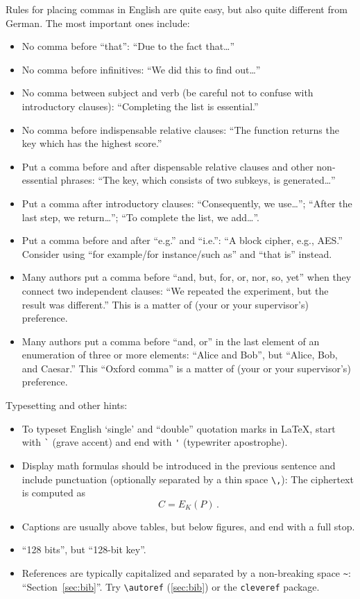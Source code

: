 \documentclass[11pt,titlepage=false]{scrreprt}
\begin{document}
Rules for placing commas in English are quite easy, but also quite different from German.
The most important ones include:
\begin{itemize}
  \item No comma before ``that'': ``Due to the fact that\dots''
  \item No comma before infinitives: ``We did this to find out\dots''
  \item No comma between subject and verb (be careful not to confuse with introductory clauses): ``Completing the list is essential.''
  \item No comma before indispensable relative clauses: ``The function returns the key which has the highest score.''
  \item Put a comma before and after dispensable relative clauses and other non-essential phrases: ``The key, which consists of two subkeys, is generated\dots''
  \item Put a comma after introductory clauses: ``Consequently, we use\dots''; ``After the last step, we return\dots''; ``To complete the list, we add\dots''.
  \item Put a comma before and after ``e.g.'' and ``i.e.'': ``A block cipher, e.g., AES.''
    Consider using ``for example/for instance/such as'' and ``that is'' instead.
  \item Many authors put a comma before ``and, but, for, or, nor, so, yet'' when they connect two independent clauses: ``We repeated the experiment, but the result was different.''
    This is a matter of (your or your supervisor's) preference.
  \item Many authors put a comma before ``and, or'' in the last element of an enumeration of three or more elements: ``Alice and Bob'', but ``Alice, Bob, and Caesar.''
    This ``Oxford comma'' is a matter of (your or your supervisor's) preference.
\end{itemize}

Typesetting and other hints:
\begin{itemize}
  \item To typeset English `single' and ``double'' quotation marks in \LaTeX, start with \verb|`| (grave accent) and end with \verb|'| (typewriter apostrophe).
  \item Display math formulas should be introduced in the previous sentence and include punctuation (optionally separated by a thin space \verb|\,|): The ciphertext is computed as
    \[C = E_K(P)\,.\]
  \item Captions are usually above tables, but below figures, and end with a full stop.
  \item ``128 bits'', but ``128-bit key''.
  \item References are typically capitalized and separated by a non-breaking space \verb|~|: ``Section~\ref{sec:bib}''.
    Try \verb|\autoref| (\autoref{sec:bib}) or the \verb|cleveref| package. %
\end{itemize}
\end{document}
